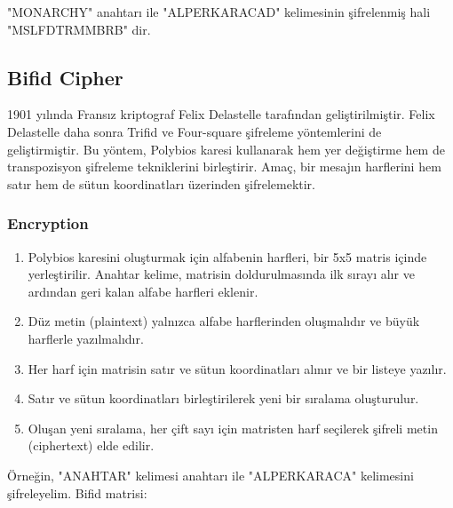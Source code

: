 "MONARCHY" anahtarı ile "ALPERKARACAD" kelimesinin şifrelenmiş hali "MSLFDTRMMBRB" dir.

\newpage

\subsection{Bifid Cipher}

1901 yılında Fransız kriptograf Felix Delastelle tarafından geliştirilmiştir. Felix Delastelle daha sonra Trifid ve Four-square şifreleme yöntemlerini de geliştirmiştir. Bu yöntem, Polybios karesi kullanarak hem yer değiştirme hem de transpozisyon şifreleme tekniklerini birleştirir. Amaç, bir mesajın harflerini hem satır hem de sütun koordinatları üzerinden şifrelemektir. 

\subsubsection{Encryption}

\begin{enumerate}
    \item Polybios karesini oluşturmak için alfabenin harfleri, bir 5x5 matris içinde yerleştirilir. Anahtar kelime, matrisin doldurulmasında ilk sırayı alır ve ardından geri kalan alfabe harfleri eklenir.
    \item Düz metin (plaintext) yalnızca alfabe harflerinden oluşmalıdır ve büyük harflerle yazılmalıdır. 
    \item Her harf için matrisin satır ve sütun koordinatları alınır ve bir listeye yazılır.
    \item Satır ve sütun koordinatları birleştirilerek yeni bir sıralama oluşturulur.
    \item Oluşan yeni sıralama, her çift sayı için matristen harf seçilerek şifreli metin (ciphertext) elde edilir.
\end{enumerate}

Örneğin, "ANAHTAR" kelimesi anahtarı ile "ALPERKARACA" kelimesini şifreleyelim. Bifid matrisi:

\begin{table}[ht]
\centering
{}
\end{table}

